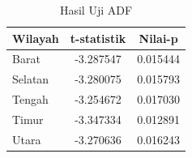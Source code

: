 \begin{table}[H]
    \centering
    \caption{Hasil Uji ADF}
    \label{table:hasil-uji-adf-arima}
    \begin{tabular}{lcc}
        \toprule
        \textbf{Wilayah} & \textbf{t-statistik} & \textbf{Nilai-p} \\
        \midrule
        Barat   & -3.287547 & 0.015444 \\
        Selatan & -3.280075 & 0.015793 \\
        Tengah  & -3.254672 & 0.017030 \\
        Timur   & -3.347334 & 0.012891 \\
        Utara   & -3.270636 & 0.016243 \\
        \bottomrule
    \end{tabular}
\end{table}